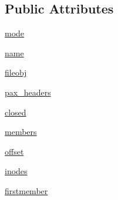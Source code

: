\subsection*{Public Attributes}
\begin{DoxyCompactItemize}
\item 
\hyperlink{classpip_1_1__vendor_1_1distlib_1_1__backport_1_1tarfile_1_1TarFile_a9a3aef761fe71257514806a096386093}{mode}
\item 
\hyperlink{classpip_1_1__vendor_1_1distlib_1_1__backport_1_1tarfile_1_1TarFile_a6ff7267d7833227b8bbcfa52f0a161be}{name}
\item 
\hyperlink{classpip_1_1__vendor_1_1distlib_1_1__backport_1_1tarfile_1_1TarFile_acdc8fe454abf94472b594ac428420058}{fileobj}
\item 
\hyperlink{classpip_1_1__vendor_1_1distlib_1_1__backport_1_1tarfile_1_1TarFile_a78277118b7f6e452024fa8a5a919af1b}{pax\+\_\+headers}
\item 
\hyperlink{classpip_1_1__vendor_1_1distlib_1_1__backport_1_1tarfile_1_1TarFile_a3f4e80cdc7d64da94d96f0ab301577a8}{closed}
\item 
\hyperlink{classpip_1_1__vendor_1_1distlib_1_1__backport_1_1tarfile_1_1TarFile_a0b907d554831d4053bc7cfac392298af}{members}
\item 
\hyperlink{classpip_1_1__vendor_1_1distlib_1_1__backport_1_1tarfile_1_1TarFile_a983644381ee32920f9355abac2896ce7}{offset}
\item 
\hyperlink{classpip_1_1__vendor_1_1distlib_1_1__backport_1_1tarfile_1_1TarFile_aa2d647770efd85f1701d7ceb249d416b}{inodes}
\item 
\hyperlink{classpip_1_1__vendor_1_1distlib_1_1__backport_1_1tarfile_1_1TarFile_adb2c3576d653c0b5ddc023f338e80ddf}{firstmember}
\end{DoxyCompactItemize}
